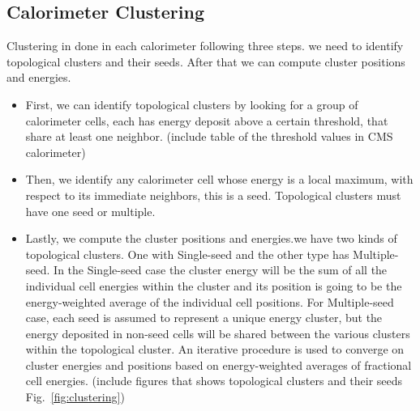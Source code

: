 \subsection{Calorimeter Clustering}
Clustering in done in each calorimeter following three steps. we need to identify topological clusters and their seeds. After that we can compute cluster positions and energies.
\begin{itemize}
 \item First, we can identify topological clusters by looking for a group of calorimeter cells, each has energy deposit above a certain threshold,
   that share at least one neighbor. (include table of the threshold values in CMS calorimeter)
   
 \item Then, we identify any calorimeter cell whose energy is a local maximum, with respect to its immediate neighbors, this is a seed. Topological clusters must have one seed or multiple.
   
 \item Lastly, we compute the cluster positions and energies.we have two kinds of topological clusters.
   One with Single-seed and the other type has Multiple-seed.
   In the Single-seed case the cluster energy will be the sum of all the individual cell energies within the cluster and its position is going to be the energy-weighted average of the individual cell positions. For Multiple-seed case, each seed is assumed to represent a unique energy cluster, but the energy deposited in non-seed cells will be shared between the various clusters within the topological cluster. An iterative procedure is used to converge on cluster energies and positions based on energy-weighted averages of fractional cell energies.
 (include figures that shows topological clusters and their seeds Fig.~\ref{fig:clustering})  

\end{itemize} 


